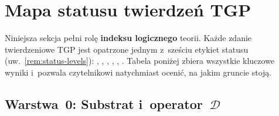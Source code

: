 \section{Mapa statusu twierdze\'n TGP}\label{sec:status-map}

\begin{center}
\end{center}

\begin{remark}\label{rem:status-map-intro}
Niniejsza sekcja pe\l{}ni rol\k{e} \textbf{indeksu logicznego} teorii.
Ka\.zde zdanie twierdzeniowe TGP jest opatrzone jednym z~sze\'sciu
etykiet statusu (uw.~\ref{rem:status-levels}):
,
,
,
,
,
.
Tabela poni\.zej zbiera wszystkie kluczowe wyniki
i~pozwala czytelnikowi natychmiast oceni\'c,
na jakim gruncie stoj\k{a}.
\end{remark}

\subsection*{Warstwa~0: Substrat i~operator~$\mathcal{D}$}

